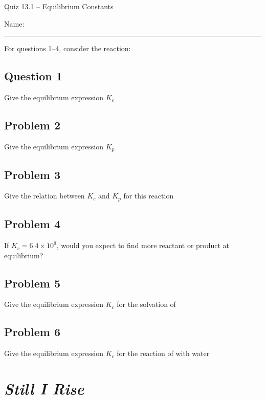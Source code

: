 \documentclass[11pt, letterpaper]{memoir}
\begin{document}
	\begin{center}
		{\large	Quiz 13.1 -- Equilibrium Constants}
	\end{center}
	{\large Name: \rule[-1mm]{4in}{.1pt} 
	
	
	\noindent	
	For questions 1--4, consider the reaction: 
	
	\subsection*{Question 1}
	Give the equilibrium expression $K_c$
	
	\vspace{3em}
	\subsection*{Problem 2}
	Give the equilibrium expression $K_p$
	
	\vspace{3em}
	\subsection*{Problem 3}
	Give the relation between $K_c$ and $K_p$ for this reaction
	
	\vspace{5em}
	\subsection*{Problem 4}
	If $K_c=6.4\times10^{9}$, would you expect to find more reactant or product at equilibrium?
	
	\vspace{3em}
	\subsection*{Problem 5}
	Give the equilibrium expression $K_c$ for the solvation of 
	
	\vspace{3em}
	\subsection*{Problem 6}
	Give the equilibrium expression $K_c$ for the reaction of  with water
	\newpage
	\pagestyle{empty}
	\addtocounter{page}{-1}
	\section*{\emph{Still I Rise}}
}
\end{document}

